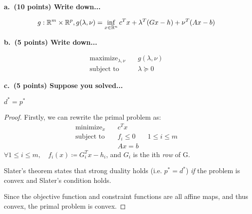 \documentclass[a4paper,10pt]{article}
\theoremstyle{definition}
\begin{document}
\textbf{a. (10 points) Write down...}

\[
    g:\mathbb{R}^m \times \mathbb{R}^p, \\
    g(\lambda, \nu) = \inf_{x\in\mathbb{R}^n}{
        c^Tx + \lambda^{T}(Gx - h) + \nu^{T}(Ax - b)
    }
\]

\textbf{b. (5 points) Write down...}

\[
\begin{aligned}
    \text{maximize}_{\lambda, \nu} \quad & g(\lambda, \nu) \\
    \text{subject to} \quad & \lambda \succeq 0
\end{aligned}
\]


\textbf{c. (5 points) Suppose you solved...}

$d^* = p^*$

\begin{proof}

Firstly, we can rewrite the primal problem as:
\[
\begin{aligned}
    \text{minimize}_{x} \quad & c^Tx \\
    \text{subject to} \quad & f_i \leq 0 \quad & 1\leq i\leq m\\
                      \quad & Ax = b
\end{aligned}
\]
 $\forall 1 \leq i \leq m, \quad f_i(x) \coloneq G^T_{i}x - h_i$, 
and $G_i$ is the ith \textit{row} of G.

% 
% 
% 
% 
% 
% 
% 
% 




Slater's theorem states that strong duality holds (i.e. $p^* = d^*$) \textit{if} the problem is convex
and Slater's condition holds.

Since the objective function and constraint functions are all affine maps, and thus convex,
the primal problem is convex.


\end{proof}
\end{document}
